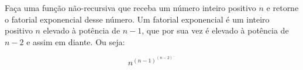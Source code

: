 
\question[10]

Faça uma função não-recursiva que receba um número inteiro positivo $n$ e retorne o fatorial exponencial desse número. Um fatorial exponencial  é um inteiro positivo $n$ elevado à potência de $n - 1$, que por sua vez é elevado à potência de $n - 2$ e assim em diante. Ou seja:

\begin{equation*}
 n^{(n-1)^{(n-2)^{\ldots}}}
\end{equation*}

